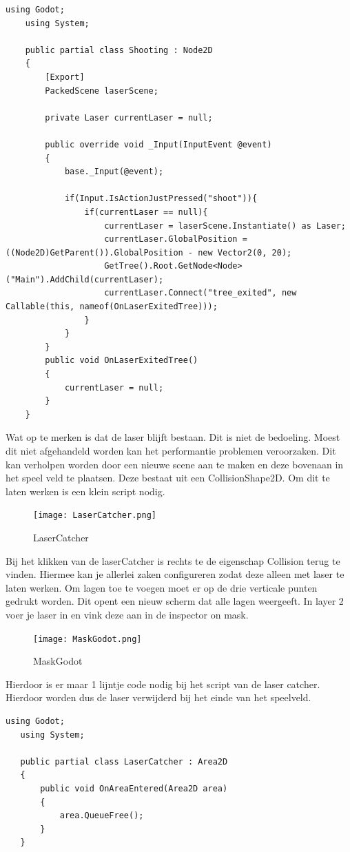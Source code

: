 \begin{lstlisting}[style=csharp]
    using Godot;
    using System;
    
    public partial class Shooting : Node2D
    {
        [Export]
        PackedScene laserScene;
        
        private Laser currentLaser = null;
        
        public override void _Input(InputEvent @event)
        {
            base._Input(@event);
            
            if(Input.IsActionJustPressed("shoot")){
                if(currentLaser == null){
                    currentLaser = laserScene.Instantiate() as Laser;
                    currentLaser.GlobalPosition = ((Node2D)GetParent()).GlobalPosition - new Vector2(0, 20);
                    GetTree().Root.GetNode<Node>("Main").AddChild(currentLaser);
                    currentLaser.Connect("tree_exited", new Callable(this, nameof(OnLaserExitedTree)));
                }
            }
        }
        public void OnLaserExitedTree()
        {
            currentLaser = null;
        }
    }   
\end{lstlisting}
Wat op te merken is dat de laser blijft bestaan. Dit is niet de bedoeling. Moest dit niet afgehandeld worden kan het performantie problemen veroorzaken. Dit kan verholpen worden door een nieuwe scene aan te maken en deze bovenaan in het speel veld te plaatsen. Deze bestaat uit een CollisionShape2D. Om dit te laten werken is een klein script nodig.
\begin{figure}[H]
    \centering
    \texttt{[image: LaserCatcher.png]}
    \caption{LaserCatcher}
    \label{fig:LaserCatcher}
\end{figure}
Bij het klikken van de laserCatcher is rechts te de eigenschap Collision terug te vinden. Hiermee kan je allerlei zaken configureren zodat deze alleen met laser te laten werken. Om lagen toe te voegen moet er op de drie verticale punten gedrukt worden. Dit opent een nieuw scherm dat alle lagen weergeeft. In layer 2 voer je laser in en vink deze aan in de inspector on mask.
\begin{figure}[H]
    \centering
    \texttt{[image: MaskGodot.png]}
    \caption{MaskGodot}
    \label{fig:MaskGodot}
\end{figure}
Hierdoor is er maar 1 lijntje code nodig bij het script van de laser catcher. Hierdoor worden dus de laser verwijderd bij het einde van het speelveld.

\begin{lstlisting}[style=csharp]
   using Godot;
   using System;
   
   public partial class LaserCatcher : Area2D
   {
       public void OnAreaEntered(Area2D area)
       {
           area.QueueFree();
       }
   }
   
\end{lstlisting}

